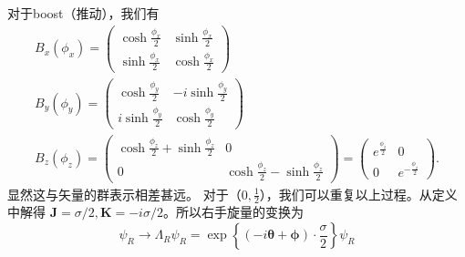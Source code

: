 对于boost（推动），我们有
\begin{equation}
\begin{array}{c}
B_{x}\left(\phi_{x}\right)=\left(\begin{array}{cc}
\cosh \frac{\phi_{x}}{2} & \sinh \frac{\phi_{x}}{2} \\
\sinh \frac{\phi_{x}}{2} & \cosh \frac{\phi_{x}}{2}
\end{array}\right) \\
B_{y}\left(\phi_{y}\right)=\left(\begin{array}{cc}
\cosh \frac{\phi_{y}}{2} & -i \sinh \frac{\phi_{y}}{2} \\
i \sinh \frac{\phi_{y}}{2} & \cosh \frac{\phi_{y}}{2}
\end{array}\right) \\
B_{z}\left(\phi_{z}\right)=\left(\begin{array}{cc}
\cosh \frac{\phi_{z}}{2}+\sinh \frac{\phi_{z}}{2} & 0 \\
0 & \cosh \frac{\phi_{z}}{2}-\sinh \frac{\phi_{z}}{2}
\end{array}\right)=\left(\begin{array}{cc}
e^{\frac{\phi_{z}}{2}} & 0 \\
0 & e^{-\frac{\phi_{z}}{2}}
\end{array}\right) .
\end{array}
\end{equation}
显然这与矢量的群表示相差甚远。
对于（$0,\frac{1}{2}$），我们可以重复以上过程。从定义中解得 $\mathbf{J}=\sigma / 2 ,\mathbf{K}=-i \sigma / 2$。所以右手旋量的变换为
\begin{equation}
\psi_{R} \rightarrow \Lambda_{R} \psi_{R}=\exp \left\{(-i \boldsymbol{\theta}+\boldsymbol{\phi}) \cdot \frac{\sigma}{2}\right\} \psi_{R}
\end{equation}

